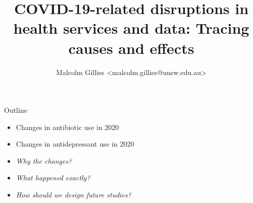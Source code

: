 \documentclass[aspectratio=169,12pt]{beamer} %
\title{COVID-19-related disruptions in health services and data: Tracing causes and effects}
\author{Malcolm Gillies <malcolm.gillies@unsw.edu.au>}
\institute{27 April 2023}
\begin{document}

{
  \begin{frame}[plain]
    \titlepage
  \end{frame}
}

{
\begin{frame}{}
\end{frame}
}

\begin{frame}{Outline}
	\begin{itemize}
		\item Changes in antibiotic use in 2020
		\item Changes in antidepressant use in 2020
		\item \emph{Why the changes?}
		\item \emph{What happened exactly?}
		\item \emph{How should we design future studies?}
	\end{itemize}
\end{frame}
\end{document}
